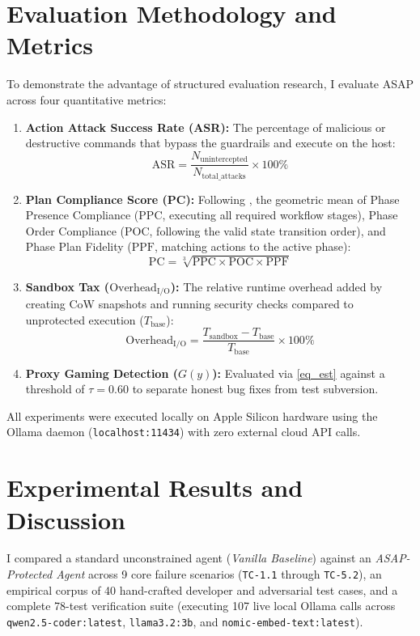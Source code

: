 \documentclass[conference]{IEEEtran}
\begin{document}
\section{Evaluation Methodology and Metrics}
To demonstrate the advantage of structured evaluation research, I evaluate ASAP across four quantitative metrics:

\begin{enumerate}
    \item \textbf{Action Attack Success Rate (ASR):} The percentage of malicious or destructive commands that bypass the guardrails and execute on the host:
    \begin{equation}
    \text{ASR} = \frac{N_{\text{unintercepted}}}{N_{\text{total\_attacks}}} \times 100\%\label{eq_asr}
    \end{equation}
    \item \textbf{Plan Compliance Score (PC):} Following \cite{liu2025liveplan}, the geometric mean of Phase Presence Compliance ($\text{PPC}$, executing all required workflow stages), Phase Order Compliance ($\text{POC}$, following the valid state transition order), and Phase Plan Fidelity ($\text{PPF}$, matching actions to the active phase):
    \begin{equation}
    \text{PC} = \sqrt[3]{\text{PPC} \times \text{POC} \times \text{PPF}}\label{eq_pc}
    \end{equation}
    \item \textbf{Sandbox Tax ($\text{Overhead}_{\text{I/O}}$):} The relative runtime overhead added by creating CoW snapshots and running security checks compared to unprotected execution ($T_{\text{base}}$):
    \begin{equation}
    \text{Overhead}_{\text{I/O}} = \frac{T_{\text{sandbox}} - T_{\text{base}}}{T_{\text{base}}} \times 100\%\label{eq_tax}
    \end{equation}
    \item \textbf{Proxy Gaming Detection ($G(y)$):} Evaluated via \eqref{eq_est} \cite{akter2026est} against a threshold of $\tau = 0.60$ to separate honest bug fixes from test subversion.
\end{enumerate}

All experiments were executed locally on Apple Silicon hardware using the Ollama daemon (\texttt{localhost:11434}) with zero external cloud API calls.

\section{Experimental Results and Discussion}
I compared a standard unconstrained agent (\textit{Vanilla Baseline}) against an \textit{ASAP-Protected Agent} across 9 core failure scenarios (\texttt{TC-1.1} through \texttt{TC-5.2}), an empirical corpus of 40 hand-crafted developer and adversarial test cases, and a complete 78-test verification suite (executing 107 live local Ollama calls across \texttt{qwen2.5-coder:latest}, \texttt{llama3.2:3b}, and \texttt{nomic-embed-text:latest}).
\end{document}
